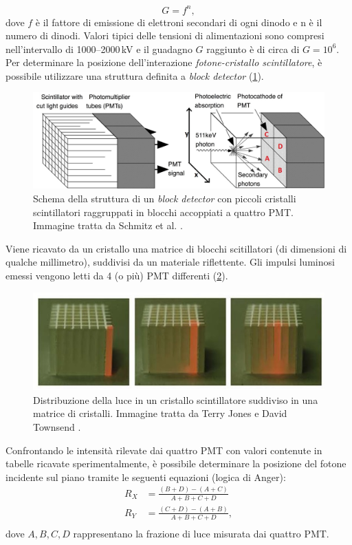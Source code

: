 \begin{equation}
	G = f^n,
\end{equation}
dove $f$ è il fattore di emissione di elettroni secondari di ogni dinodo e n è il numero di dinodi. Valori tipici delle tensioni di alimentazioni sono  compresi nell'intervallo di \numrange[range-phrase=--]{1000}{2000}\,\unit{\kilo\volt} e il guadagno $G$ raggiunto è di circa di $G=10^6$. Per determinare la posizione dell'interazione \textit{fotone-cristallo scintillatore}, è possibile utilizzare una struttura definita a \textit{block detector} (\Fig\ref{fig:block_detector}).
\begin{figure}[t]
	\centering
	\includegraphics[width=0.8\linewidth]{./ImageFiles/block_detector.jpg}
	\caption{Schema della struttura di un \textit{block detector} con piccoli cristalli scintillatori raggruppati in blocchi accoppiati a quattro PMT. Immagine tratta da Schmitz et al. \cite{Schmitz2013ThePO}.} 
	\label{fig:block_detector}
\end{figure}
Viene ricavato da un cristallo una matrice di blocchi scitillatori (di dimensioni di qualche millimetro), suddivisi da un materiale riflettente. Gli impulsi luminosi emessi vengono letti da 4 (o più) PMT differenti (\Fig\ref{fig:block_detector_cube}).
\begin{figure}[b]
	\centering
	\includegraphics[width=0.6\linewidth]{./ImageFiles/block_detector_lightoncube.jpg}
	\caption{Distribuzione della luce in un cristallo scintillatore suddiviso in una matrice di cristalli. Immagine tratta da Terry Jones e David Townsend \cite{Jones2017}.} 
	\label{fig:block_detector_cube}
\end{figure}
Confrontando le intensità rilevate dai quattro PMT con valori contenute in tabelle ricavate sperimentalmente, è possibile determinare la posizione del fotone incidente sul piano tramite le seguenti equazioni \cite{Bailey2014} (logica di Anger):
\begin{equation}
	\begin{split}
		R_X&=\frac{(B+D)-(A+C)}{A+B+C+D} \\
		R_Y&=\frac{(C+D)-(A+B)}{A+B+C+D}, \\
	\end{split}
\end{equation}
dove $A,B,C,D$ rappresentano la frazione di luce misurata dai quattro PMT.

